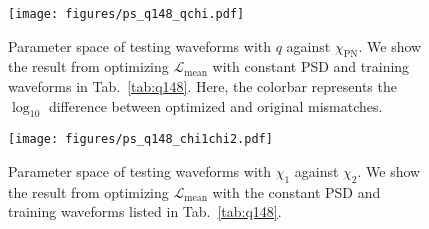\documentclass[twocolumn]{aastex631}
\begin{document}
\begin{figure}[t]
	\centering
	\texttt{[image: figures/ps\_q148\_qchi.pdf]}
	\caption{Parameter space of testing waveforms with $q$ against $\chi_{\mathrm{PN}}$. 
	We show the result from optimizing $\mathcal{L}_{\mathrm{mean}}$ with constant PSD 
	and training waveforms in Tab.~\ref{tab:q148}. Here, the colorbar represents the 
	$\log_{10}$ difference between optimized and original mismatches.}
	\label{fig:ps_q148_qchi}
\end{figure}
\begin{figure}[t]
	\centering
	\texttt{[image: figures/ps\_q148\_chi1chi2.pdf]}
	\caption{Parameter space of testing waveforms with $\chi_1$ against $\chi_2$. We
	show the result from optimizing $\mathcal{L}_{\mathrm{mean}}$ with the
	constant PSD and training waveforms listed in Tab.~\ref{tab:q148}.}
	\label{fig:ps_q148}
\end{figure}
\end{document}
